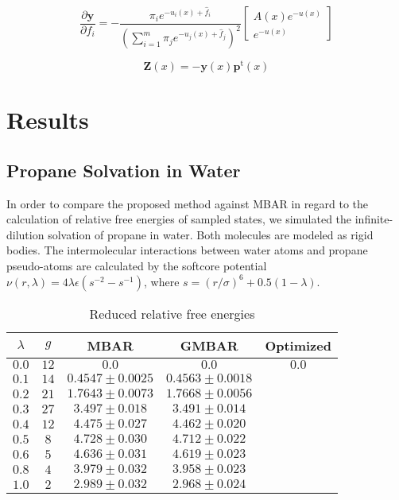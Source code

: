 \documentclass[aip,jcp,reprint,amsmath,amssymb]{revtex4-1}
\newcommand{\mt}[1]{\boldsymbol{\mathbf{#1}}}           %
\newcommand{\vt}[1]{\boldsymbol{\mathbf{#1}}}           %
\newcommand{\tr}[1]{#1^\text{t}}                        %
\begin{document}
\begin{equation}
\frac{\partial \vt y}{\partial f_i} = -\frac{\pi_i e^{-u_i(x) + \hat f_i}}{\left(\sum_{i=1}^m \pi_j e^{-u_j(x) + \hat f_j}\right)^2} \left[\begin{array}{c} A(x)e^{-u(x)} \\ e^{-u(x)} \end{array}\right]
\end{equation}

\begin{equation}
\mt Z(x) = -{\vt y(x)}\tr{\vt p}(x)
\end{equation}

\section{Results}

\subsection{Propane Solvation in Water}

In order to compare the proposed method against MBAR in regard to the calculation of relative free energies of sampled states, we simulated the infinite-dilution solvation of propane in water. Both molecules are modeled as rigid bodies. The intermolecular interactions between water atoms and propane pseudo-atoms are calculated by the softcore potential\cite{Beutler_1994} $\nu(r,\lambda) = 4\lambda\epsilon(s^{-2} - s^{-1})$, where $s = (r/\sigma)^6 + 0.5 (1-\lambda)$.

\begin{table}
\caption{Reduced relative free energies}
\label{table:propane solvation}
\begin{ruledtabular}
\begin{tabular}{ccccc}
$\lambda$ & $g$ & MBAR & GMBAR & Optimized \\
\hline
$0.0$ & $12$ & $0.0$ & $0.0$ & $0.0$ \\
$0.1$ & $14$ & $0.4547 \pm 0.0025$ & $0.4563 \pm 0.0018$ \\
$0.2$ & $21$ & $1.7643 \pm 0.0073$ & $1.7668 \pm 0.0056$ \\
$0.3$ & $27$ &  $3.497 \pm 0.018$  &  $3.491 \pm 0.014$ \\
$0.4$ & $12$ &  $4.475 \pm 0.027$  &  $4.462 \pm 0.020$ \\
$0.5$ & $8$  &  $4.728 \pm 0.030$  &  $4.712 \pm 0.022$ \\
$0.6$ & $5$  &  $4.636 \pm 0.031$  &  $4.619 \pm 0.023$ \\
$0.8$ & $4$  &  $3.979 \pm 0.032$  &  $3.958 \pm 0.023$ \\
$1.0$ & $2$  &  $2.989 \pm 0.032$  &  $2.968 \pm 0.024$
\end{tabular}
\end{ruledtabular}
\end{table}
\end{document}
